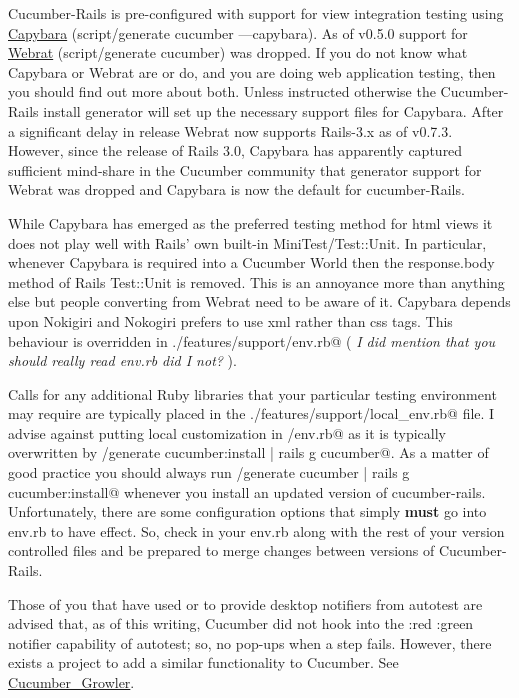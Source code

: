 Cucumber-Rails is pre-configured with support for view integration testing using  \href{http://github.com/jnicklas/capybara}{Capybara} (script/generate  cucumber ---capybara).  As of v0.5.0 support for \href{http://github.com/brynary/webrat}{Webrat} (script/generate cucumber) was dropped. If you do not know what Capybara or Webrat are or do,  and you are doing web application testing, then you should find out more about both.  Unless instructed otherwise the Cucumber-Rails install generator will set up the necessary support files for Capybara.  After a significant delay in release Webrat now supports Rails-3.x as of v0.7.3.  However, since the release of Rails 3.0, Capybara has apparently captured sufficient mind-share in the Cucumber community that generator support for Webrat was dropped and Capybara is now the default for cucumber-Rails.

While Capybara has emerged as the preferred testing method for html views it does not play well with Rails' own built-in MiniTest/Test::Unit.  In particular, whenever Capybara is required into a Cucumber World then the response.body method of Rails Test::Unit is removed.  This is an annoyance more than anything else but people converting from Webrat need to be aware of it.  Capybara depends upon Nokigiri and Nokogiri prefers to use xml rather than css tags.  This behaviour is overridden in \verb@./features/support/env.rb@ ( \emph{I did mention that you should really read env.rb did I not?} ).

Calls for any additional Ruby libraries that your particular testing environment may require are typically placed in the \verb@./features/support/local_env.rb@ file.  I advise against putting local customization in \verb@support/env.rb@ as it is typically overwritten by \verb@script/generate cucumber:install | rails g cucumber@.  As a matter of good practice you should always run \verb@script/generate cucumber | rails g cucumber:install@ whenever you install an updated version of cucumber-rails. Unfortunately, there are some configuration options that simply \textbf{must} go into env.rb to have effect.  So, check in your env.rb along with the rest of your version controlled files and be prepared to merge changes between versions of Cucumber-Rails.

Those of you that have used \verb@growl@ or \verb@snarl@ to provide desktop notifiers from autotest are advised that, as of this writing, Cucumber did not hook into the :red :green notifier capability of autotest;  so, no pop-ups when a step fails.  However, there exists a project to add a similar functionality to Cucumber. See \href{http://github.com/paolodona/cucumber_growler/tree/master}{Cucumber\_Growler}.

